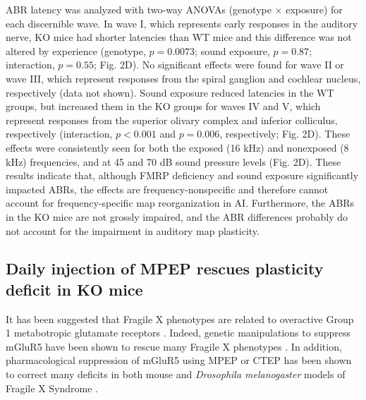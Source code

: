 ABR latency was analyzed with two-way ANOVAs (genotype $\times$ exposure) for each discernible wave. In wave I, which represents early responses in the auditory nerve, KO mice had shorter latencies than WT mice and this difference was not altered by experience (genotype, $p=0.0073$; sound exposure, $p=0.87$; interaction, $p=0.55$; Fig. 2D). No significant effects were found for wave II or wave III, which represent responses from the spiral ganglion and cochlear nucleus, respectively (data not shown). Sound exposure reduced latencies in the WT groups, but increased them in the KO groups for waves IV and V, which represent responses from the superior olivary complex and inferior colliculus, respectively (interaction, $p<0.001$ and $p=0.006$, respectively; Fig. 2D). These effects were consistently seen for both the exposed (16 kHz) and nonexposed (8 kHz) frequencies, and at 45 and 70 dB sound pressure levels (Fig. 2D). These results indicate that, although FMRP deficiency and sound exposure significantly impacted ABRs, the effects are frequency-nonspecific and therefore cannot account for frequency-specific map reorganization in AI. Furthermore, the ABRs in the KO mice are not grossly impaired, and the ABR differences probably do not account for the impairment in auditory map plasticity.

\subsection{Daily injection of MPEP rescues plasticity deficit in KO mice}

It has been suggested that Fragile X phenotypes are related to overactive Group 1 metabotropic glutamate receptors \cite{Bear2004}. Indeed, genetic manipulations to suppress mGluR5 have been shown to rescue many Fragile X phenotypes \cite{Dolen2007}. In addition, pharmacological suppression of mGluR5 using MPEP or CTEP has been shown to correct many deficits in both mouse and \textit{Drosophila melanogaster} models of Fragile X Syndrome \cite{McBride2005, Yan2005, DeVrij2008, Meredith2011, Su2011, Michalon2012, Thomas2012}.

